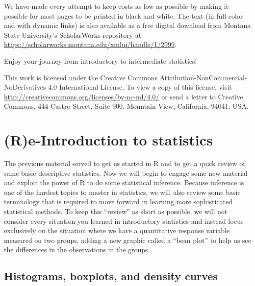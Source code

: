 \documentclass[]{book}
\theoremstyle{definition}
\theoremstyle{definition}
\theoremstyle{remark}
\begin{document}
We have made every attempt to keep costs as low as possible by making it
possible for most pages to be printed in black and white. The text (in
full color and with dynamic links) is also available as a free digital
download from Montana State University's ScholarWorks repository at
\url{https://scholarworks.montana.edu/xmlui/handle/1/2999}.

Enjoy your journey from introductory to intermediate statistics!

This work is licensed under the Creative Commons
Attribution-NonCommercial-NoDerivatives 4.0 International License. To
view a copy of this license, visit
\url{http://creativecommons.org/licenses/by-nc-nd/4.0/} or send a letter
to Creative Commons, 444 Castro Street, Suite 900, Mountain View,
California, 94041, USA.

\chapter{(R)e-Introduction to statistics}\label{chapter2}

The previous material served to get us started in R and to get a quick
review of same basic descriptive statistics. Now we will begin to engage
some new material and exploit the power of R to do some statistical
inference. Because inference is one of the hardest topics to master in
statistics, we will also review some basic terminology that is required
to move forward in learning more sophisticated statistical methods. To
keep this ``review'' as short as possible, we will not consider every
situation you learned in introductory statistics and instead focus
exclusively on the situation where we have a quantitative response
variable measured on two groups, adding a new graphic called a ``bean
plot'' to help us see the differences in the observations in the groups.

\section{Histograms, boxplots, and density curves}\label{section2-1}
\end{document}
